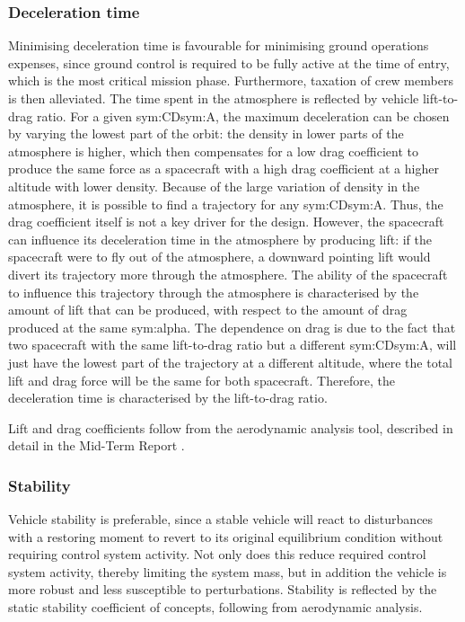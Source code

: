 \subsubsection{Deceleration time}
Minimising deceleration time is favourable for minimising ground operations expenses, since ground control is required to be fully active at the time of entry, which is the most critical mission phase. Furthermore, taxation of crew members is then alleviated. The time spent in the atmosphere is reflected by vehicle lift-to-drag ratio. For a given \gls{sym:CD}\gls{sym:A}, the maximum deceleration can be chosen by varying the lowest part of the orbit: the density in lower parts of the atmosphere is higher, which then compensates for a low drag coefficient to produce the same force as a spacecraft with a high drag coefficient at a higher altitude with lower density. Because of the large variation of density in the atmosphere, it is possible to find a trajectory for any \gls{sym:CD}\gls{sym:A}. Thus, the drag coefficient itself is not a key driver for the design. However, the spacecraft can influence its deceleration time in the atmosphere by producing lift: if the spacecraft were to fly out of the atmosphere, a downward pointing lift would divert its trajectory more through the atmosphere. The ability of the spacecraft to influence this trajectory through the atmosphere is characterised by the amount of lift that can be produced, with respect to the amount of drag produced at the same \gls{sym:alpha}. The dependence on drag is due to the fact that two spacecraft with the same lift-to-drag ratio but a different \gls{sym:CD}\gls{sym:A}, will just have the lowest part of the trajectory at a different altitude, where the total lift and drag force will be the same for both spacecraft. Therefore, the deceleration time is characterised by the  lift-to-drag ratio. 

Lift and drag coefficients follow from the aerodynamic analysis tool, described in detail in the Mid-Term Report \cite[p.34-46]{Balasooriyan2015b}.

\subsubsection{Stability}
Vehicle stability is preferable, since a stable vehicle will react to disturbances with a restoring moment to revert to its original equilibrium condition without requiring control system activity. Not only does this reduce required control system activity, thereby limiting the system mass, but in addition the vehicle is more robust and less susceptible to perturbations. Stability is reflected by the static stability coefficient of concepts, following from aerodynamic analysis.

